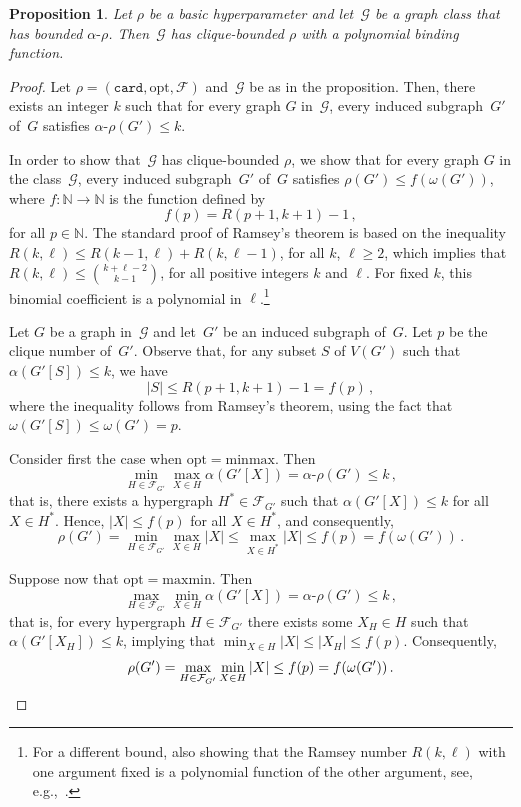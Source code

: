 \documentclass[11pt]{article}
\newcommand{\opt}{\mathrm{opt}}
\theoremstyle{plain}
\newtheorem{proposition}[theorem]{Proposition}
\theoremstyle{definition}
\theoremstyle{remark}
\numberwithin{equation}{section}
\begin{document}
\begin{proposition}\label{prop:main}
Let $\rho$ be a basic hyperparameter and let~$\mathcal{G}$ be a graph class that has bounded $\alpha\text{-}\rho$.
Then~$\mathcal{G}$ has clique-bounded $\rho$ with a polynomial binding function.
\end{proposition}

\begin{proof}
Let $\rho = (\mathtt{card}, \opt, \mathcal{F})$ and~$\mathcal{G}$ be as in the proposition.
Then, there exists an integer $k$ such that for every graph $G$ in~$\mathcal{G}$, every induced subgraph~$G'$ of~$G$ satisfies $\alpha\text{-}\rho(G')\le k$. 

In order to show that~$\mathcal{G}$ has clique-bounded $\rho$, we show that for every graph $G$ in the class~$\mathcal{G}$, every induced subgraph~$G'$ of~$G$ satisfies $\rho(G')\le f(\omega(G'))$, where $f:\mathbb{N}\to \mathbb{N}$ is the function defined by
\[f(p) = R(p+1,k+1)-1\,,\]
for all $p\in \mathbb{N}$.
The standard proof of Ramsey’s theorem is based on the inequality $R(k,\ell) \leq R(k-1, \ell)+R(k,\ell-1)$, for all $k$, $\ell \geq 2$, which implies that $R(k,\ell) \leq \binom{k+\ell-2}{k-1}$, for all positive integers $k$ and $\ell$.
For fixed $k$, this binomial coefficient is a polynomial in $\ell$.\footnote{For a different bound, also showing that the Ramsey number $R(k,\ell)$ with one argument fixed is a polynomial function of the other argument, see, e.g.,~\cite[Theorem 1.9]{MR4672178}.}

Let $G$ be a graph in~$\mathcal{G}$ and let~$G'$ be an induced subgraph of~$G$.
Let $p$ be the clique number of~$G'$.
Observe that, for any subset $S$ of $V(G')$ such that $\alpha(G'[S])\le k$, we have
\[|S|\le R(p+1, k+1)-1 = f(p)\,,\]
where the inequality follows from Ramsey's theorem, using the fact that $\omega(G'[S]) \le \omega(G') = p$.

Consider first the case when $\mathrm{opt}= \mathrm{minmax}$.
Then
\[\min_{H \in \mathcal{F}_{G'}} \max_{X \in H} \alpha(G'[X]) = \alpha\text{-}\rho(G') \le k\,,\]
that is, there exists a hypergraph $H^* \in \mathcal{F}_{G'}$ such that $\alpha(G'[X])\le k$ for all $X\in H^*$.
Hence, $|X|\le f(p)$ for all $X\in H^*$, and consequently,
\[\rho(G') = \min_{H \in \mathcal{F}_{G'}} \max_{X \in H}|X|\le  \max_{X \in H^*}|X| \le f(p) = f(\omega(G'))\,.\]

Suppose now that $\mathrm{opt}= \mathrm{maxmin}$.
Then
\[\max_{H \in \mathcal{F}_{G'}} \min_{X \in H} \alpha(G'[X]) = \alpha\text{-}\rho(G') \le k\,,\]
that is, for every hypergraph $H \in \mathcal{F}_{G'}$ there exists some $X_H\in H$ such that $\alpha(G'[X_H])\le k$, implying that $\min_{X \in H}|X| \le |X_H|\le f(p)$.
Consequently,
\[\rho(G') = \max_{H \in \mathcal{F}_{G'}} \min_{X \in H}|X| \le f(p) = f(\omega(G'))\,.\qedhere\]
\end{proof}
\end{document}
